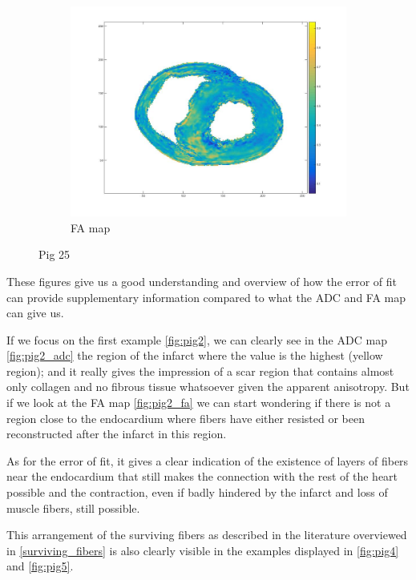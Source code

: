 \begin{figure}[h!]
\begin{subfigure}{.31\textwidth}
        \includegraphics[width=\textwidth]{figures/pig25_fa_30}
        \caption{FA map}
        \label{fig:pig25_fa}
    \end{subfigure}
    \caption{Pig 25}
    \label{fig:pig25}
\end{figure}

These figures give us a good understanding and overview of how the error of fit can provide supplementary information compared to what the ADC and FA map can give us.

If we focus on the first example \ref{fig:pig2}, we can clearly see in the ADC map \ref{fig:pig2_adc} the region of the infarct where the value is the highest (yellow region); and it really gives the impression of a scar region that contains almost only collagen and no fibrous tissue whatsoever given the apparent anisotropy. But if we look at the FA map \ref{fig:pig2_fa} we can start wondering if there is not a region close to the endocardium where fibers have either resisted or been reconstructed after the infarct in this region.

As for the error of fit, it gives a clear indication of the existence of layers of fibers near the endocardium that still makes the connection with the rest of the heart possible and the contraction, even if badly hindered by the infarct and loss of muscle fibers, still possible.

This arrangement of the surviving fibers as described in the literature overviewed in \ref{surviving_fibers} is also clearly visible in the examples displayed in \ref{fig:pig4} and \ref{fig:pig5}.


